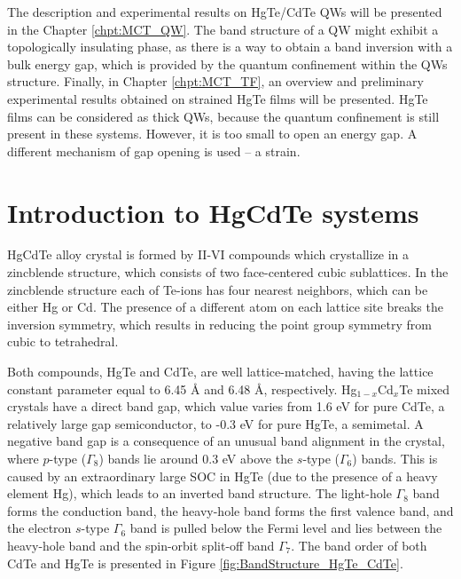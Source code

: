 \documentclass[titlepage,a4paper]{book}
\newcommand{\wciecie}{\quad\phantom{v}}
\begin{document}
The description and experimental results on HgTe/CdTe QWs will be presented in the Chapter \ref{chpt:MCT_QW}. The band structure of a QW might exhibit a topologically insulating phase, as there is a way to obtain a band inversion with a bulk energy gap, which is provided by the quantum confinement within the QWs structure.
Finally, in Chapter \ref{chpt:MCT_TF}, an overview and preliminary experimental results obtained on strained HgTe films will be presented. HgTe films can be considered as thick QWs, because the quantum confinement is still present in these systems. However, it is too small to open an energy gap. A different mechanism of gap opening is used -- a strain.

\section{Introduction to HgCdTe systems}
\wciecie
HgCdTe alloy crystal is formed by II-VI compounds which crystallize in a zincblende structure, which consists of two face-centered cubic sublattices. In the zincblende structure each of Te-ions has four nearest neighbors, which can be either Hg or Cd. The presence of a different atom on each lattice site breaks the inversion symmetry, which results in reducing the point group symmetry from cubic to tetrahedral. 

Both compounds, HgTe and CdTe, are well lattice-matched, having the lattice constant parameter equal to 6.45 Å and 6.48 Å, respectively. Hg$_{1-x}$Cd$_x$Te mixed crystals have a direct band gap, which value varies from 1.6 eV for pure CdTe, a relatively large gap semiconductor, to -0.3 eV for pure HgTe, a semimetal. A negative band gap is a consequence of an unusual band alignment in the crystal, where $p$-type ($\Gamma_8$) bands lie around 0.3 eV above the $s$-type ($\Gamma_6$) bands. This is caused by an extraordinary large SOC in HgTe (due to the presence of a heavy element Hg), which leads to an inverted band structure. The light-hole $\Gamma_8$ band forms the conduction band, the heavy-hole band forms the first valence band, and the electron $s$-type $\Gamma_6$ band is pulled below the Fermi level and lies between the heavy-hole band and the spin-orbit split-off band $\Gamma_7$. The band order of both CdTe and HgTe is presented in Figure \ref{fig:BandStructure_HgTe_CdTe}.
\end{document}
